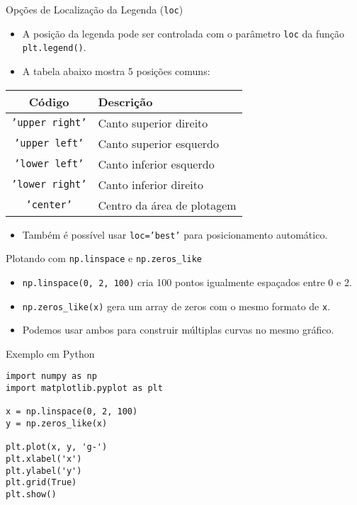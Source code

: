 \begin{frame}{Opções de Localização da Legenda (\texttt{loc})}
    \begin{itemize}
        \item A posição da legenda pode ser controlada com o parâmetro \texttt{loc} da função \texttt{plt.legend()}.
        \item A tabela abaixo mostra 5 posições comuns:
    \end{itemize}

    \vspace{0.5em}
    \begin{table}[]
    \centering
    \begin{tabular}{|c|l|}
        \hline
        \textbf{Código}         & \textbf{Descrição}              \\ \hline
        \texttt{'upper right'}  & Canto superior direito          \\ \hline
        \texttt{'upper left'}   & Canto superior esquerdo         \\ \hline
        \texttt{'lower left'}   & Canto inferior esquerdo         \\ \hline
        \texttt{'lower right'}  & Canto inferior direito          \\ \hline
        \texttt{'center'}       & Centro da área de plotagem      \\ \hline
    \end{tabular}
    \end{table}

    \vspace{0.5em}
    \begin{itemize}
        \item Também é possível usar \texttt{loc='best'} para posicionamento automático.
    \end{itemize}
\end{frame}


\begin{frame}[fragile]{Plotando com \texttt{np.linspace} e \texttt{np.zeros\_like}}
    \begin{itemize}
        \item \texttt{np.linspace(0, 2, 100)} cria 100 pontos igualmente espaçados entre 0 e 2.
        \item \texttt{np.zeros\_like(x)} gera um array de zeros com o mesmo formato de \texttt{x}.
        \item Podemos usar ambos para construir múltiplas curvas no mesmo gráfico.
    \end{itemize}

    \begin{block}{Exemplo em Python}
\begin{verbatim}
import numpy as np
import matplotlib.pyplot as plt

x = np.linspace(0, 2, 100)
y = np.zeros_like(x)

plt.plot(x, y, 'g-')
plt.xlabel('x')
plt.ylabel('y')
plt.grid(True)
plt.show()
\end{verbatim}
    \end{block}
\end{frame}

